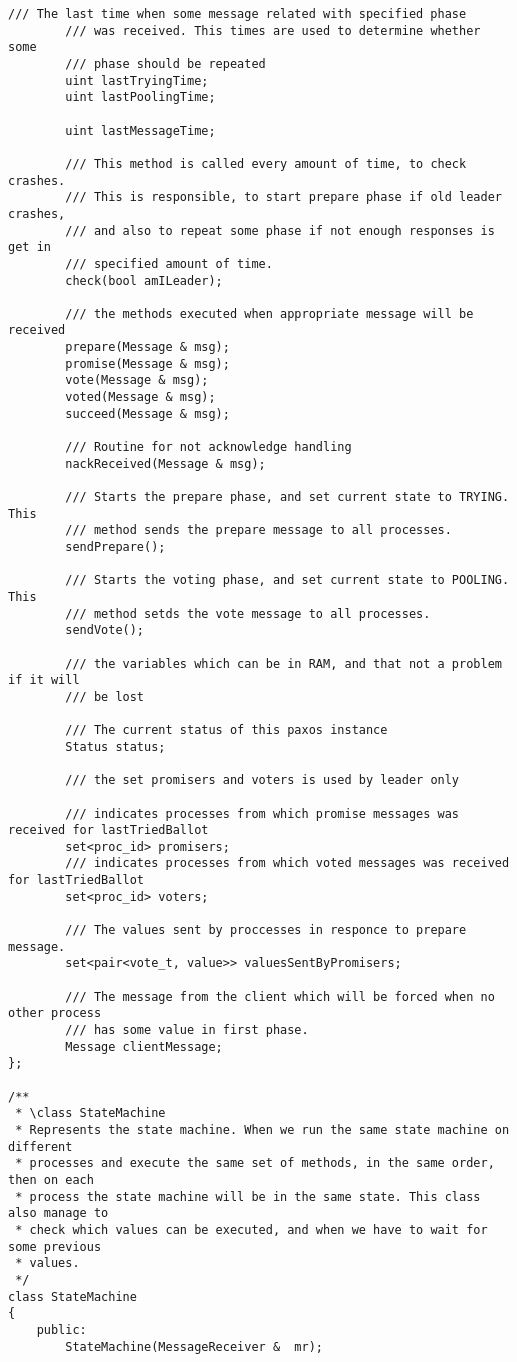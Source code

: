 \begin{lstlisting}[frame=lines,caption=Pseudocode of Paxos algorithm]
		/// The last time when some message related with specified phase
		/// was received. This times are used to determine whether some 
		/// phase should be repeated
		uint lastTryingTime;
		uint lastPoolingTime;
		
		uint lastMessageTime;
	
		/// This method is called every amount of time, to check crashes.
		/// This is responsible, to start prepare phase if old leader crashes,
		/// and also to repeat some phase if not enough responses is get in 
		/// specified amount of time.
		check(bool amILeader);
	
		/// the methods executed when appropriate message will be received
		prepare(Message & msg);
		promise(Message & msg);
		vote(Message & msg);
		voted(Message & msg);
		succeed(Message & msg);
		
		/// Routine for not acknowledge handling
		nackReceived(Message & msg);
		
		/// Starts the prepare phase, and set current state to TRYING. This 
		/// method sends the prepare message to all processes.
		sendPrepare();
		
		/// Starts the voting phase, and set current state to POOLING. This
		/// method setds the vote message to all processes.
		sendVote();
		
		/// the variables which can be in RAM, and that not a problem if it will
		/// be lost
		
		/// The current status of this paxos instance
		Status status;
		
		/// the set promisers and voters is used by leader only
		
		/// indicates processes from which promise messages was received for lastTriedBallot
		set<proc_id> promisers; 
		/// indicates processes from which voted messages was received for lastTriedBallot
		set<proc_id> voters;
		
		/// The values sent by proccesses in responce to prepare message.
		set<pair<vote_t, value>> valuesSentByPromisers;
		
		/// The message from the client which will be forced when no other process
		/// has some value in first phase.
		Message clientMessage;
};

/**
 * \class StateMachine
 * Represents the state machine. When we run the same state machine on different 
 * processes and execute the same set of methods, in the same order, then on each 
 * process the state machine will be in the same state. This class also manage to
 * check which values can be executed, and when we have to wait for some previous 
 * values.
 */
class StateMachine
{
	public:
		StateMachine(MessageReceiver &  mr);
		

\end{lstlisting}
